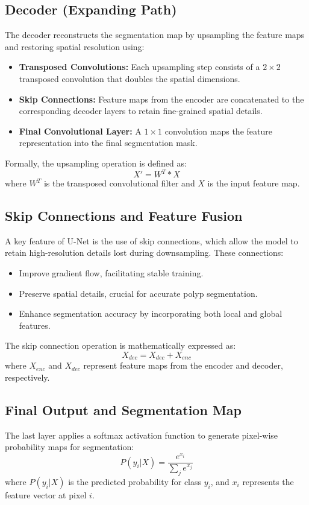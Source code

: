 \subsection{Decoder (Expanding Path)}
The decoder reconstructs the segmentation map by upsampling the feature maps and restoring spatial resolution using:
\begin{itemize}
    \item \textbf{Transposed Convolutions:} Each upsampling step consists of a \(2 \times 2\) transposed convolution that doubles the spatial dimensions.
    \item \textbf{Skip Connections:} Feature maps from the encoder are concatenated to the corresponding decoder layers to retain fine-grained spatial details.
    \item \textbf{Final Convolutional Layer:} A \(1 \times 1\) convolution maps the feature representation into the final segmentation mask.
\end{itemize}
Formally, the upsampling operation is defined as:
\begin{equation}
    X' = W^T * X
\end{equation}
where \(W^T\) is the transposed convolutional filter and \(X\) is the input feature map.

\subsection{Skip Connections and Feature Fusion}
A key feature of U-Net is the use of skip connections, which allow the model to retain high-resolution details lost during downsampling. These connections:
\begin{itemize}
    \item Improve gradient flow, facilitating stable training.
    \item Preserve spatial details, crucial for accurate polyp segmentation.
    \item Enhance segmentation accuracy by incorporating both local and global features.
\end{itemize}
The skip connection operation is mathematically expressed as:
\begin{equation}
    X_{dec} = X_{dec} + X_{enc}
\end{equation}
where \(X_{enc}\) and \(X_{dec}\) represent feature maps from the encoder and decoder, respectively.

\subsection{Final Output and Segmentation Map}
The last layer applies a softmax activation function to generate pixel-wise probability maps for segmentation:
\begin{equation}
    P(y_i | X) = \frac{e^{x_i}}{\sum_j e^{x_j}}
\end{equation}
where \(P(y_i | X)\) is the predicted probability for class \(y_i\), and \(x_i\) represents the feature vector at pixel \(i\).

